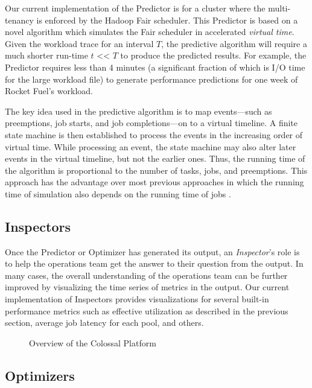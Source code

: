 Our current implementation of the Predictor is for a 
cluster where the multi-tenancy is enforced by the Hadoop
Fair scheduler. This Predictor is based on a novel algorithm
which simulates the Fair scheduler in accelerated {\em virtual
time}. Given the workload trace for an interval $T$, the predictive
algorithm will require a much shorter run-time $t$ << $T$ to produce the
predicted results. For example, the Predictor requires less than 
4 minutes (a significant fraction of which is I/O time for 
the large workload file) to generate 
performance predictions for one week of Rocket Fuel's workload.

The key idea used in the predictive algorithm is to map events---such as
preemptions, job starts, and job completions---on to a virtual timeline. A
finite state machine is then established to process the events in the
increasing order of virtual time. While processing an event, the state
machine may also alter later events in the virtual timeline, but
not the earlier ones. Thus, the running time of the algorithm is
proportional to the number of tasks, jobs, and preemptions.
This approach has
the advantage over most previous approaches in which the running time of
simulation also depends on the running time of jobs
\cite{sls,conf/cluster/VermaCC11,mr-sim}.

\subsection{Inspectors}

Once the Predictor or Optimizer 
has generated its output, an {\em Inspector}'s
role is to help the operations team get the answer to 
their question from the output. In many cases, the 
overall understanding of the operations team can be further improved by 
visualizing the time series of metrics in the output. 
Our current implementation of Inspectors 
provides visualizations for several built-in performance metrics 
such as effective utilization as
described in the previous section, average job latency for
each pool, and others. 

\begin{figure}
  \centering {}
  \caption{Overview of the Colossal Platform}
  \vspace{-6mm}
\end{figure}

\subsection{Optimizers}
\label{sec:optimizer}

